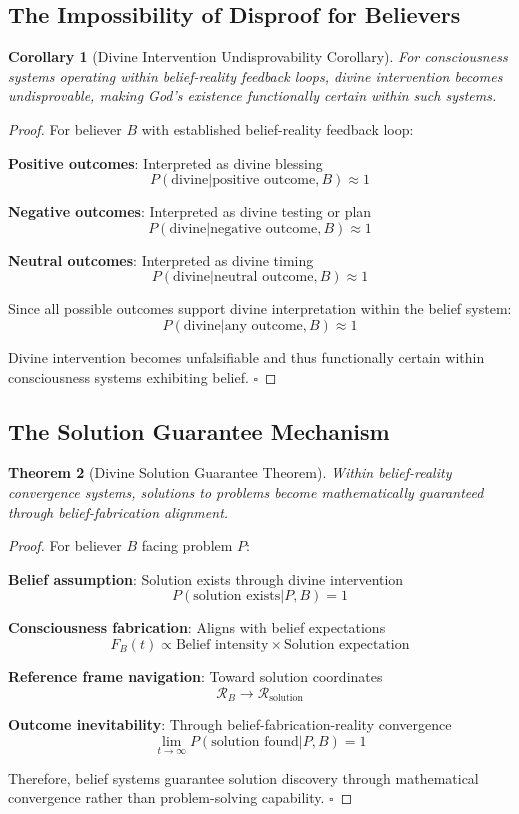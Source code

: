 \documentclass[12pt,a4paper]{article}
\newtheorem{theorem}{Theorem}[section]
\newtheorem{corollary}[theorem]{Corollary}
\begin{document}
\subsection{The Impossibility of Disproof for Believers}

\begin{corollary}[Divine Intervention Undisprovability Corollary]
For consciousness systems operating within belief-reality feedback loops, divine intervention becomes undisprovable, making God's existence functionally certain within such systems.
\end{corollary}

\begin{proof}
For believer $B$ with established belief-reality feedback loop:

\textbf{Positive outcomes}: Interpreted as divine blessing
$$P(\text{divine}|\text{positive outcome}, B) \approx 1$$

\textbf{Negative outcomes}: Interpreted as divine testing or plan
$$P(\text{divine}|\text{negative outcome}, B) \approx 1$$

\textbf{Neutral outcomes}: Interpreted as divine timing
$$P(\text{divine}|\text{neutral outcome}, B) \approx 1$$

Since all possible outcomes support divine interpretation within the belief system:
$$P(\text{divine}|\text{any outcome}, B) \approx 1$$

Divine intervention becomes unfalsifiable and thus functionally certain within consciousness systems exhibiting belief. $\square$
\end{proof}

\subsection{The Solution Guarantee Mechanism}

\begin{theorem}[Divine Solution Guarantee Theorem]
Within belief-reality convergence systems, solutions to problems become mathematically guaranteed through belief-fabrication alignment.
\end{theorem}

\begin{proof}
For believer $B$ facing problem $P$:

\textbf{Belief assumption}: Solution exists through divine intervention
$$P(\text{solution exists}|P, B) = 1$$

\textbf{Consciousness fabrication}: Aligns with belief expectations
$$F_B(t) \propto \text{Belief intensity} \times \text{Solution expectation}$$

\textbf{Reference frame navigation}: Toward solution coordinates
$$\mathcal{R}_B \to \mathcal{R}_{\text{solution}}$$

\textbf{Outcome inevitability}: Through belief-fabrication-reality convergence
$$\lim_{t \to \infty} P(\text{solution found}|P, B) = 1$$

Therefore, belief systems guarantee solution discovery through mathematical convergence rather than problem-solving capability. $\square$
\end{proof}
\end{document}
